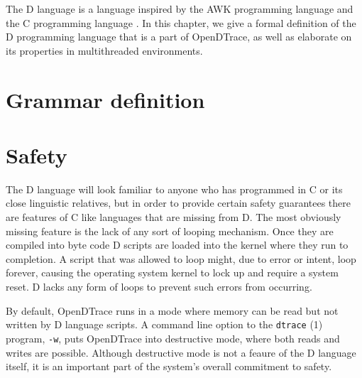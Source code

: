 The D language is a language inspired by the AWK programming language
\cite{Aho:1987:APL:29361} and the C programming language
\cite{DTrace2004}\cite{Kernighan:1988}. In this chapter, we give a
formal definition of the D programming language that is a part of
OpenDTrace, as well as elaborate on its properties in multithreaded
environments.

\section{Grammar definition}
\label{sec:grammar}



\ebnftable

\section{Safety}
\label{sec:safety}

The D language will look familiar to anyone who has programmed in C or
its close linguistic relatives, but in order to provide certain
safety guarantees there are features of C like languages that are
missing from D.  The most obviously missing feature is the lack of any
sort of looping mechanism.  Once they are compiled into byte code D
scripts are loaded into the kernel where they run to completion.  A
script that was allowed to loop might, due to error or intent, loop
forever, causing the operating system kernel to lock up and require a
system reset.  D lacks any form of loops to prevent such errors from
occurring.

By default, OpenDTrace runs in a mode where memory can be read but not
written by D language scripts.  A command line option to the \texttt{dtrace} (1)
program, \texttt{-w}, puts OpenDTrace into destructive mode, where both reads
and writes are possible.  Although destructive mode is not a feaure of
the D language itself, it is an important part of the system's overall
commitment to safety.



